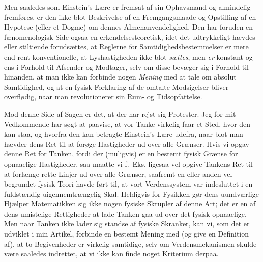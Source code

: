 \documentclass[12pt,a4paper]{article}
\newcommand{\opage}[1]{\marginnote{\footnotesize\textit{[#1]}}}
\begin{document}
Men saaledes som Einstein's Lære er fremsat af sin Ophavsmand og almindelig
fremføres, er den ikke blot Beskrivelse af en Fremgangsmaade og Opstilling af
en Hypotese (eller et Dogme) om dennes Almenanvendelighed. Den har foruden en
fænomenologisk Side ogsaa en erkendelsesteoretisk, idet det udtrykkeligt
hævdes eller stiltiende forudsættes, at Reglerne for Samtidighedsbestemmelser
er mere end rent konventionelle, at Lyshastigheden ikke blot \emph{sættes},
men \emph{er} konstant og ens i Forhold til Afsender og Modtager, selv om
disse bevæger sig i Forhold til hinanden, at man ikke kan forbinde nogen
\emph{Mening} med at tale om absolut Samtidighed, og at en fysisk Forklaring
af de omtalte Modsigelser bliver overflødig, naar man revolutionerer sin
Rum- og Tidsopfattelse.

Mod denne Side af Sagen er det, at der har rejst sig Protester. Jeg for mit
Vedkommende har søgt at paavise, at vor Tanke virkelig faar \guillemotright et
Sted, hvor den kan staa\guillemotleft, og hvorfra den kan betragte
Einstein's Lære udefra, naar blot man hævder dens Ret til at forøge
Hastigheder ud over alle Grænser. Hvis vi opgav denne Ret for Tanken, fordi
der (muligvis) er en bestemt fysisk Grænse for opnaaelige Hastigheder, saa
maatte vi f.~Eks. ligesaa vel opgive Tankens Ret til
\opage{167} at forlænge rette Linjer ud over alle Grænser, saafremt en eller anden vel
begrundet fysisk Teori havde ført til, at vort Verdenssystem var indesluttet
i en fuldstændig uigennemtrængelig Skal. Heldigvis for Fysikken gør dens
uundværlige Hjælper Matematikken sig ikke nogen fysiske Skrupler af denne
Art; det er en af dens umistelige Rettigheder at lade Tanken gaa ud over det
fysisk opnaaelige. Men naar Tanken ikke lader sig standse af fysiske
Skranker, kan vi, som det er udviklet i min Artikel, forbinde en bestemt
Mening med (og give en Definition af), at to Begivenheder er virkelig
samtidige, selv om Verdensmekanismen skulde være saaledes indrettet, at vi
ikke kan finde noget Kriterium derpaa.
\end{document}
